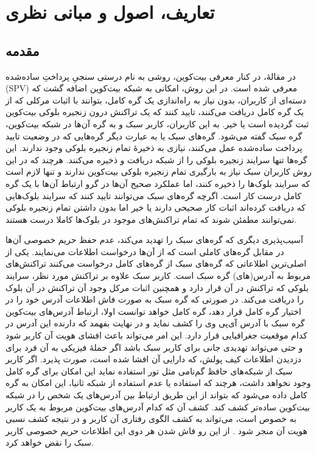 \chapter{تعاریف، اصول و مبانی نظری}
\label{def}
\section{مقدمه}
در مقالهٔ\cite{Nakamoto2009}، در کنار معرفی بیت‌کوین، روشی به نام درستی سنجیِ پرداختِ ساده‌شده (SPV) معرفی شده است. در این روش، امکانی به شبکه بیت‌کوین اضافه گشت که دسته‌ای از کاربران، بدون نیاز به راه‌اندازی یک گره کامل، بتوانند با اثبات مرکلی که از یک گره کامل دریافت می‌کنند، تایید کنند که یک تراکنش درون زنجیره بلوکی بیت‌کوین ثبت گردیده‌ است یا خیر. به این کاربران، کاربر سبک و به گره آن‌ها در شبکه بیت‌کوین، گره سبک گفته می‌شود. گره‌های سبک یا به عبارت دیگر گره‌هایی که در وضعیت تایید پرداخت ساده‌شده عمل می‌کنند، نیازی به ذخیرهٔ تمام زنجیره بلوکی وجود ندارند. این گره‌ها تنها سرایند زنجیره بلوکی را از شبکه دریافت و ذخیره می‌کنند.  هرچند که در این روش کاربران سبک نیاز به بارگیری تمام زنجیره بلوکی بیت‌‌کوین ندارند و تنها لازم است که سرایند بلوک‌ها را ذخیره کنند،‌ اما عملکرد صحیح آن‌ها در گرو ارتباط آن‌ها با یک گره کامل درست کار است. اگرچه گره‌های سبک می‌توانند تایید کنند که سرایند بلوک‌هایی که دریافت کرده‌اند اثبات کار صحیحی دارند یا خیر اما بدون داشتن تمام زنجیره بلوکی نمی‌توانند مطمئن شوند که تمام تراکنش‌های موجود در بلوک‌ها کاملا درست هستند.

آسیب‌پذیری دیگری که گره‌های سبک را تهدید می‌کند، عدم حفظ حریم خصوصی آن‌ها در مقابل گره‌های کاملی است که از آن‌ها درخواست اطلاعات می‌نمایند. یکی از اصلی‌ترین اطلاعاتی که گره‌های سبک از گره‌های کامل درخواست می‌کنند تراکنش‌های مربوط به آدرس(های) گره سبک است. کاربر سبک علاوه بر تراکنش مورد نظر، سرایند بلوکی که تراکنش در آن قرار دارد و همچنین اثبات مرکل وجود آن تراکنش در آن بلوک را دریافت می‌کند. در صورتی که گره سبک به صورت فاش اطلاعات آدرس خود را در اختیار گره کامل قرار دهد، گره کامل خواهد توانست اولا، ارتباط آدرس‌های بیت‌کوین گره سبک با آدرس آی‌پی وی را کشف نماید و در نهایت بفهمد که دارنده این آدرس در کدام موقعیت جغرافیایی قرار دارد. این امر می‌تواند باعث افشای هویت آن کاربر شود و حتی می‌تواند تهدیدی جانی برای کاربر سبک باشد اگر حملهٔ فیزیکی به آن فرد برای دزدیدن اطلاعات کیف پولش، که دارایی آن افشا شده است، صورت پذیرد. اگر کاربر سبک از 
شبکه‌های حافظ گم‌نامی
 مثل تور استفاده نماید این امکان برای گره کامل وجود نخواهد داشت، هرچند که استفاده یا عدم استفاده از شبکه
 ثانیا، این امکان به گره کامل داده می‌شود که بتواند از این طریق ارتباط بین آدرس‌های یک شخص را در شبکه بیت‌کوین ساده‌تر کشف کند. کشف آن که کدام آدرس‌های بیت‌کوین مربوط به یک کاربر به خصوص است، می‌تواند به کشف الگوی رفتاری آن کاربر و در نتیجه کشف نسبی هویت آن منجر شود \cite{Ron2013}. از این رو فاش شدن هر دوی این اطلاعات حریم خصوصی کاربر سبک را نقض خواهد کرد.

